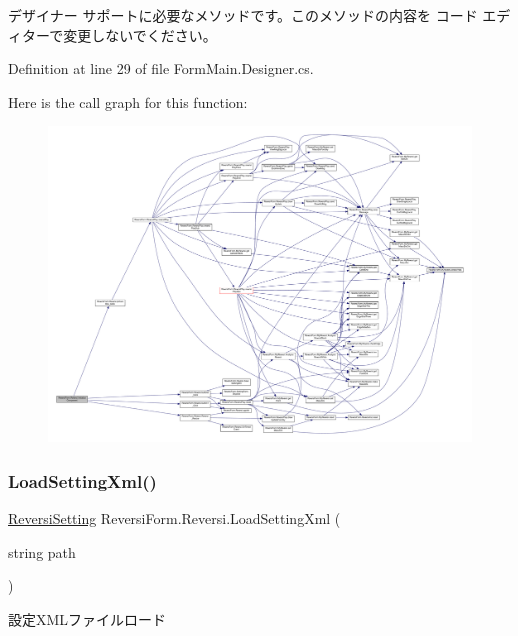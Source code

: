 デザイナー サポートに必要なメソッドです。このメソッドの内容を コード エディターで変更しないでください。 



Definition at line 29 of file Form\+Main.\+Designer.\+cs.

Here is the call graph for this function\+:
\nopagebreak
\begin{figure}[H]
\begin{center}
\leavevmode
\includegraphics[width=350pt]{class_reversi_form_1_1_reversi_abec0816dd006d05b512d86b45a20af68_cgraph}
\end{center}
\end{figure}
\mbox{\label{class_reversi_form_1_1_reversi_afbe64672e4a4c9e6f6404a3bbf2b5e1d}} 
\subsubsection{\texorpdfstring{Load\+Setting\+Xml()}{LoadSettingXml()}}
{\footnotesize\ttfamily \hyperlink{class_reversi_form_1_1_reversi_setting}{Reversi\+Setting} Reversi\+Form.\+Reversi.\+Load\+Setting\+Xml (\begin{DoxyParamCaption}\item[{string}]{path }\end{DoxyParamCaption})}



設定\+X\+M\+Lファイルロード 


